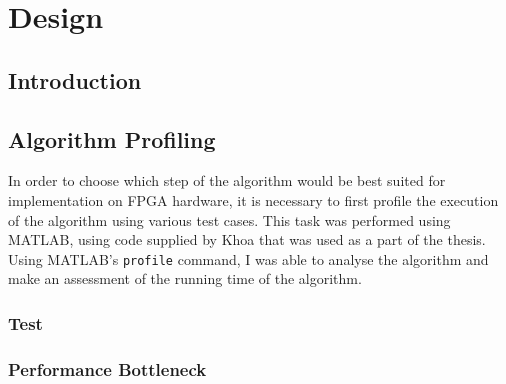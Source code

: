 \chapter{Design}
\label{ch:design}

\section{Introduction}
\label{sec:designIntroduction}

\section{Algorithm Profiling}
\label{sec:algorithmProfiling}
In order to choose which step of the algorithm would be best suited for 
implementation on FPGA hardware, it is necessary to first profile the execution 
of the algorithm using various test cases. This task was performed using MATLAB,
using code supplied by Khoa that was used as a part of the thesis. Using 
MATLAB's \verb+profile+ command, I was able to analyse the algorithm and make an
assessment of the running time of the algorithm.

\subsection{Test}


\subsection{Performance Bottleneck}
\label{sec:algorithmPerformanceBottleneck}

